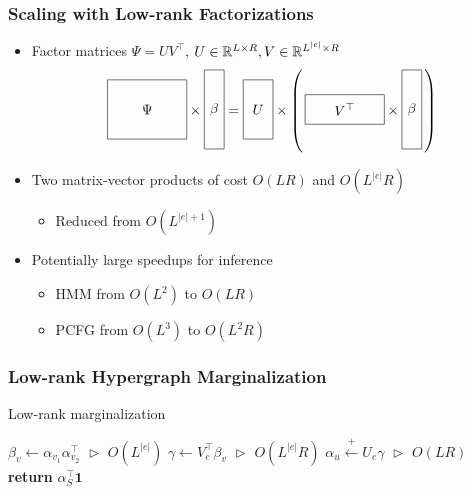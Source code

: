 \documentclass{beamer}
\begin{document}
\begin{frame}
\frametitle{Scaling with Low-rank Factorizations}
\begin{itemize}
\item Factor matrices $\Psi=UV^\top$,
$U\in\mathbb{R}^{L \times R},V\in\mathbb{R}^{L^{|e|}\times R}$
\[
\vcenter{\hbox{\begin{tikzpicture}[baseline=-0.5ex]
    \draw (0,0) rectangle (2,1.5) node[pos=.5] {$\Psi$};
\end{tikzpicture}}}
\times
\vcenter{\hbox{\begin{tikzpicture}[baseline=-0.5ex]
    \draw (0,0) rectangle (.5,2) node[pos=.5] {$\beta$};
\end{tikzpicture}}}
=
\vcenter{\hbox{\begin{tikzpicture}[baseline=-0.5ex]
    \draw (0,0) rectangle (.75,1.5) node[pos=.5] {$U$};
\end{tikzpicture}}}
\times
\left(\,
\vcenter{\hbox{\begin{tikzpicture}[baseline=-0.5ex]
    \draw (0,0) rectangle (2,.75) node[pos=.5] {$V^\top$};
\end{tikzpicture}}}
\times
\vcenter{\hbox{\begin{tikzpicture}[baseline=-0.5ex]
    \draw (0,0) rectangle (.5,2) node[pos=.5] {$\beta$};
\end{tikzpicture}}}
\,\right)
\]
\item Two matrix-vector products of cost $O(LR)$ and $O(L^{|e|}R)$
    \begin{itemize}
    \item Reduced from $O(L^{|e|+1})$
    \end{itemize}
\vspace{1em}
\item Potentially large speedups for inference
    \begin{itemize}
    \item HMM from $O(L^2)$ to $O(LR)$
    \item PCFG from $O(L^3)$ to $O(L^2R)$
    \end{itemize}
\end{itemize}
\end{frame}

\begin{frame}
\frametitle{Low-rank Hypergraph Marginalization}
\centering

\begin{algorithm}[H]
\caption{\label{alg:low-rank-update} Low-rank marginalization}
\begin{algorithmic} 
\STATE $\beta_v \gets \alpha_{v_1}\alpha_{v_2}^\top$
    \hfill $\vartriangleright$ $O(L^{|e|})$
\STATE $\gamma \gets V_e^\top\beta_v$
    \hfill $\vartriangleright$ $O(L^{|e|}R)$
\STATE $\alpha_u \stackrel{+}{\gets} U_e\gamma $
    \hfill $\vartriangleright$ $O(LR)$
\ENDFOR
\STATE \textbf{return} $\alpha_S^\top\mathbf{1}$
\end{algorithmic} 
\end{algorithm}

\end{frame}
\end{document}
